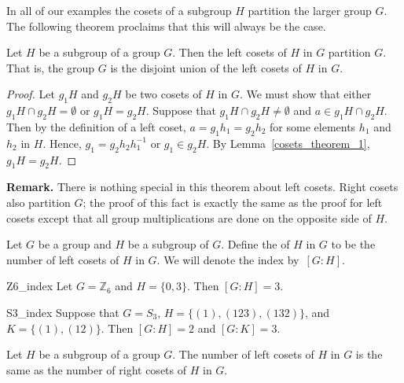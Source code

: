 In all of our  examples the cosets of a subgroup $H$ partition the larger group $G$.  The following theorem proclaims that this will always be the case. 

\begin{theorem}\label{cosets_theorem_2}
Let $H$ be a subgroup of a group $G$.  Then the left cosets of $H$ in $G$ partition $G$.  That is, the group $G$ is the disjoint union of the left cosets of $H$ in $G$. 
\end{theorem}

\begin{proof}
Let $g_1 H$ and $g_2 H$ be two cosets of $H$ in $G$.  We must show that either $g_1 H \cap g_2 H = \emptyset$ or $g_1 H = g_2 H$.  Suppose that $g_1 H \cap g_2 H \neq \emptyset$ and $a \in g_1 H \cap g_2 H$.  Then by the definition of a left coset, $a = g_1 h_1 = g_2 h_2$ for some elements $h_1$ and $h_2$ in $H$.  Hence, $g_1 = g_2 h_2 h_1^{-1}$ or $g_1 \in g_2 H$.  By Lemma~\ref{cosets_theorem_1}, $g_1 H = g_2 H$. 
\end{proof}

\medskip

\noindent \textbf{Remark.}
There is nothing special in this theorem about left cosets.  Right cosets also partition $G$; the proof of this fact is exactly the same as the proof for left cosets except that all group multiplications are done on the opposite side of $H$. 

\medskip

Let $G$ be a group and $H$ be a subgroup of $G$.  Define the  of $H$ in $G$ to be the number of left cosets of $H$ in $G$.  We will denote the index by~$[G:H]$\label{indexofasubgroup}.  

\begin{example}{Z6_index}
Let $G= {\mathbb Z}_6$ and $H = \{ 0, 3 \}$. Then $[G:H] = 3$.
\end{example}

\begin{example}{S3_index}
Suppose that $G= S_3$, $H = \{ (1),(123), (132) \}$, and $K= \{ (1), (12) \}$.  Then $[G:H] = 2$ and $[G:K] = 3$. 
\end{example}

\begin{theorem}\label{cosets_theorem_3}
Let $H$ be a subgroup of a group $G$.  The number of left cosets of $H$ in $G$ is the same as the number of right cosets of $H$ in $G$.  
\end{theorem}


